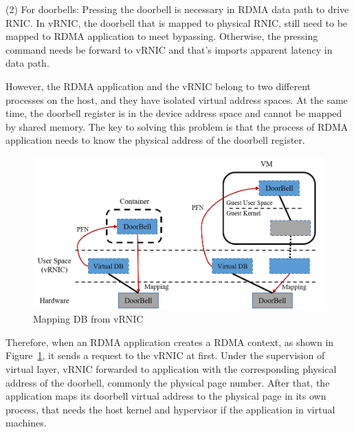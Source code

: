 (2) For doorbells: Pressing the doorbell is necessary in RDMA data path to drive RNIC. In vRNIC, the doorbell that is mapped to physical RNIC, still need to be mapped to RDMA application to meet bypassing. Otherwise, the pressing command needs be forward to vRNIC and that’s imports apparent latency in data path.

However, the RDMA application and the vRNIC belong to two different processes on the host, and they have isolated virtual address spaces. At the same time, the doorbell register is in the device address space and cannot be mapped by shared memory. The key to solving this problem is that the process of RDMA application needs to know the physical address of the doorbell register.

\begin{figure}[!ht]
	\centering
	\includegraphics[width=1.0\linewidth]{images/by-pass}
	\caption{Mapping DB from vRNIC}
	\label{fig:by-pass}
\end{figure}

Therefore, when an RDMA application creates a RDMA context, as shown in Figure~\ref{fig:by-pass}, it sends a request to the vRNIC at first. Under the supervision of virtual layer, vRNIC forwarded to application with the corresponding physical address of the doorbell, commonly the physical page number. After that, the application maps its doorbell virtual address to the physical page in its own process, that needs the host kernel and hypervisor if the application in virtual machines.

